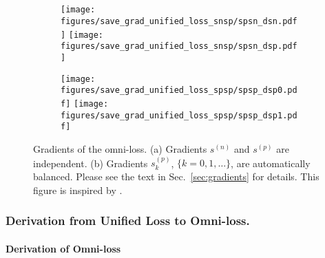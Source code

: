 \documentclass[paper_2425.tex]{subfiles}
\begin{document}
\appendix



\begin{center}
  \doparttoc \faketableofcontents \part{}
  \parttoc
  \vspace{2cm}
\end{center}




\begin{figure*}[t]
\begin{subfigure}{0.5\textwidth}
    \centering
\texttt{[image: figures/save\_grad\_unified\_loss\_snsp/spsn\_dsn.pdf]}
    \texttt{[image: figures/save\_grad\_unified\_loss\_snsp/spsn\_dsp.pdf]}
\caption{}
\end{subfigure}
  \hspace{0.1cm}
  \begin{subfigure}{.5\textwidth}
    \centering
\texttt{[image: figures/save\_grad\_unified\_loss\_spsp/spsp\_dsp0.pdf]}
    \texttt{[image: figures/save\_grad\_unified\_loss\_spsp/spsp\_dsp1.pdf]}
\caption{}
\end{subfigure}
  \vspace{-0.3cm}
  \caption{Gradients of the omni-loss. (a) Gradients \wrt $s^{(n)}$ and $s^{(p)}$ are independent. (b) Gradients \wrt $s^{(p)}_{k}$, $\{k=0,1,\dots\}$, are automatically balanced. Please see the text in Sec.~\ref{sec:gradients} for details. This figure is inspired by \cite{sun2020Circle}.}
  \vspace{-0.3cm}
  \label{fig:gradient}
\end{figure*}

\section{Derivation from Unified Loss to Omni-loss.}
\label{apx:derivation_omniloss}


\subsection{Derivation of Omni-loss}
\end{document}
